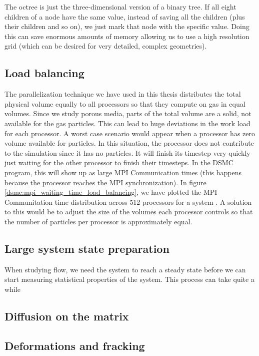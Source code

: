The octree is just the three-dimensional version of a binary tree. If all eight children of a node have the same value, instead of saving all the children (plus their children and so on), we just mark that node with the specific value. Doing this can save enormous amounts of memory allowing us to use a high resolution grid (which can be desired for very detailed, complex geometries).

\subsection{Load balancing}
\label{sec:future_work_load_balancing}
The parallelization technique we have used in this thesis distributes the total physical volume equally to all processors so that they compute on gas in equal volumes. Since we study porous media, parts of the total volume are a solid, not available for the gas particles. This can lead to huge deviations in the work load for each processor. A worst case scenario would appear when a processor has zero volume available for particles. In this situation, the processor does not contribute to the simulation since it has no particles. It will finish its timestep very quickly just waiting for the other processor to finish their timesteps. In the DSMC program, this will show up as large MPI Communication times (this happens because the processor reaches the MPI synchronization). In figure \ref{dsmc:mpi_waiting_time_load_balancing}, we have plotted the MPI Communitation time distribution across 512 processors for a system . A solution to this would be to adjust the size of the volumes each processor controls so that the number of particles per processor is approximately equal. 
\subsection{Large system state preparation}
When studying flow, we need the system to reach a steady state before we can start measuring statistical properties of the system. This process can take quite a while 
\subsection{Diffusion on the matrix}

\subsection{Deformations and fracking}
